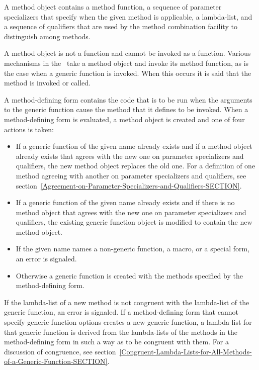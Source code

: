 A method object contains a method function, a sequence of {\bit
parameter specializers\/} that specify when the given method is
applicable, a lambda-list, and a sequence of {\bit qualifiers\/} that
are used by the method combination facility to distinguish among
methods.

A method object is not a function and cannot be invoked as a function. 
Various mechanisms in the \OS\ take a method object and invoke its method
function, as is the case when a generic function is invoked.  When this
occurs it is said that the method is invoked or called.

A method-defining form contains the code that is to be run when the
arguments to the generic function cause the method that it defines to
be invoked.  When a method-defining form is evaluated, a method object
is created and one of four actions is taken:

\begin{itemize}

\item  If a generic function of the given name already exists
and if a method object already exists that agrees with the new one on
parameter specializers and qualifiers, the new method object replaces
the old one.  For a definition of one method agreeing with another on
parameter specializers and qualifiers, see
section~\ref{Agreement-on-Parameter-Specializers-and-Qualifiers-SECTION}.

\item  If a generic function of the given name already exists
and if there is no method object that agrees with the new one on
parameter specializers and qualifiers, the existing generic function
object is modified to contain the new method object.

\item  If the given name names a non-generic function, a macro,
or a special form, an error is signaled.

\item  Otherwise a generic function is created with the methods
specified by the method-defining form.

\end{itemize}

If the lambda-list of a new method is not congruent with the lambda-list
of the generic function, an error is signaled.  If a
method-defining form that cannot specify generic function options
creates a new generic function, a lambda-list for that generic
function is derived from the lambda-lists of the methods in the
method-defining form in such a way as to be congruent with them.  For
a discussion of {\bit congruence}, see
section~\ref{Congruent-Lambda-Lists-for-All-Methods-of-a-Generic-Function-SECTION}.

